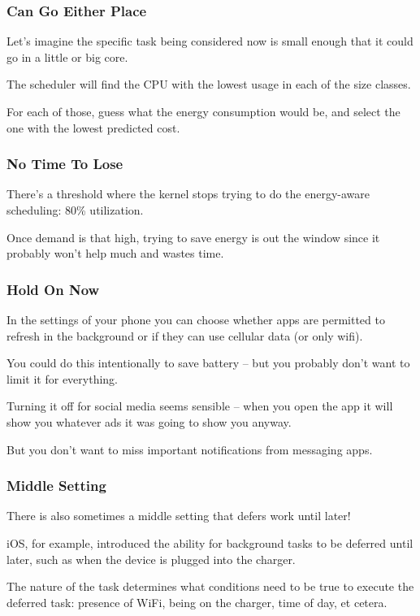 \begin{frame}
\frametitle{Can Go Either Place}

Let's imagine the specific task being considered now is small enough that it could go in a little or big core. 

The scheduler will find the CPU with the lowest usage in each of the size classes. 

For each of those, guess what the energy consumption would be, and select the one with the lowest predicted cost. 

\end{frame}

\begin{frame}
\frametitle{No Time To Lose}

There's a threshold where the kernel stops trying to do the energy-aware scheduling: 80\% utilization. 

Once demand is that high, trying to save energy is out the window since it probably won't help much and wastes time. 


\end{frame}



\begin{frame}
\frametitle{Hold On Now}

 In the settings of your phone you can choose whether apps are permitted to refresh in the background or if they can use cellular data (or only wifi). 
 
 You could do this intentionally to save battery -- but you probably don't want to limit it for everything. 

 
 Turning it off for social media seems sensible -- when you open the app it will show you whatever ads it was going to show you anyway.
 
 But you don't want to miss important notifications from messaging apps. 

\end{frame}


\begin{frame}
\frametitle{Middle Setting}

There is also sometimes a middle setting that defers work until later! 

iOS, for example, introduced the ability for background tasks to be deferred until later, such as when the device is plugged into the charger.

The nature of the task determines what conditions need to be true to execute the deferred task: presence of WiFi, being on the charger, time of day, et cetera. 

\end{frame}


